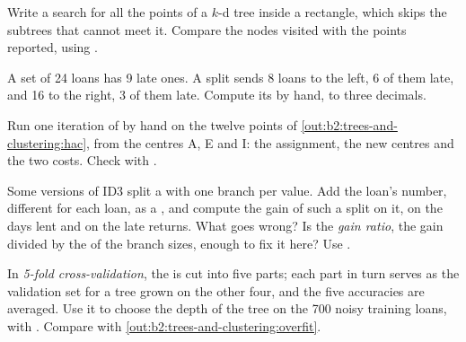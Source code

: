 \begin{exercise}[$\star$]\label{exo:b2:trees-and-clustering:3}
Write a search for all the points of a $k$-d tree inside a rectangle, which skips the subtrees that cannot meet it.
Compare the nodes visited with the points reported, using .
\end{exercise}

\begin{exercise}[$\star$]\label{exo:b2:trees-and-clustering:4}
A set of 24 loans has 9 late ones. A split sends 8 loans to the left, 6 of them late, and 16 to the right, 3 of them
late. Compute its  by hand, to three decimals.
\end{exercise}

\begin{exercise}[$\star\star$]\label{exo:b2:trees-and-clustering:5}
Run one iteration of  by hand on the twelve points of \cref{out:b2:trees-and-clustering:hac}, from the
centres A, E and I: the assignment, the new centres and the two costs. Check with .
\end{exercise}

\begin{exercise}[$\star\star$]\label{exo:b2:trees-and-clustering:6}
Some versions of ID3 split a  with one branch per value. Add the loan's number, different for each loan, as a
, and compute the gain of such a split on it, on the days lent and on the late returns. What goes wrong? Is the
\emph{gain ratio}, the gain divided by the  of the branch sizes, enough to fix it here? Use
.
\end{exercise}

\begin{exercise}[$\star\star$]\label{exo:b2:trees-and-clustering:7}
In \emph{5-fold cross-validation}, the  is cut into five parts; each part in turn serves as the validation
set for a tree grown on the other four, and the five accuracies are averaged. Use it to choose the depth of the tree on
the 700 noisy training loans, with . Compare with \cref{out:b2:trees-and-clustering:overfit}.
\end{exercise}

